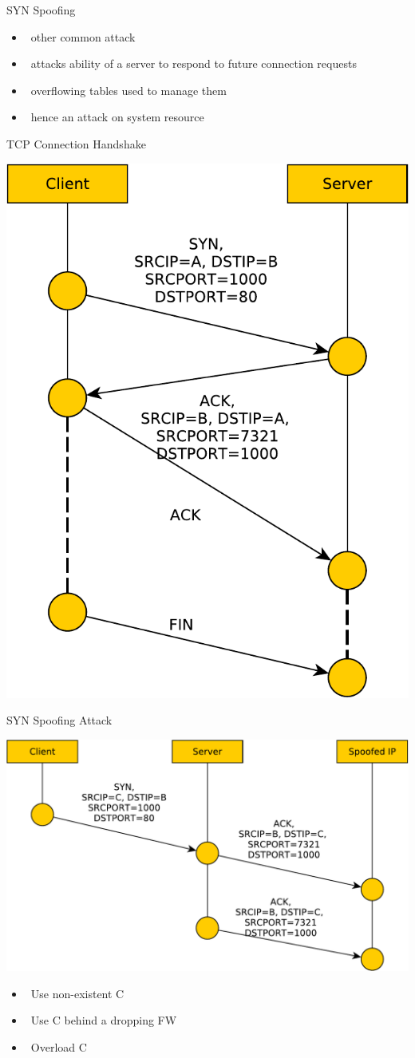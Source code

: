 \documentclass{beamer}
\begin{document}
\begin{frame}{SYN Spoofing }
  \begin{itemize}
  \item  other common attack 
  \item  attacks ability of a server to respond to future 
    connection requests 
  \item  overflowing tables used to manage them 
  \item  hence an attack on system resource
  \end{itemize}
\end{frame}


\begin{frame}{TCP Connection Handshake}
  \begin{center}
    \includegraphics[width=0.5\linewidth]{syn1}
  \end{center}
\end{frame}

\begin{frame}{SYN Spoofing Attack}
  \begin{center}
    \includegraphics[width=0.8\linewidth]{syn2}
  \end{center}
  \begin{itemize}
  \item  Use non-existent C
  \item  Use C behind a dropping FW
  \item  Overload C
  \end{itemize}
\end{frame}
\end{document}
